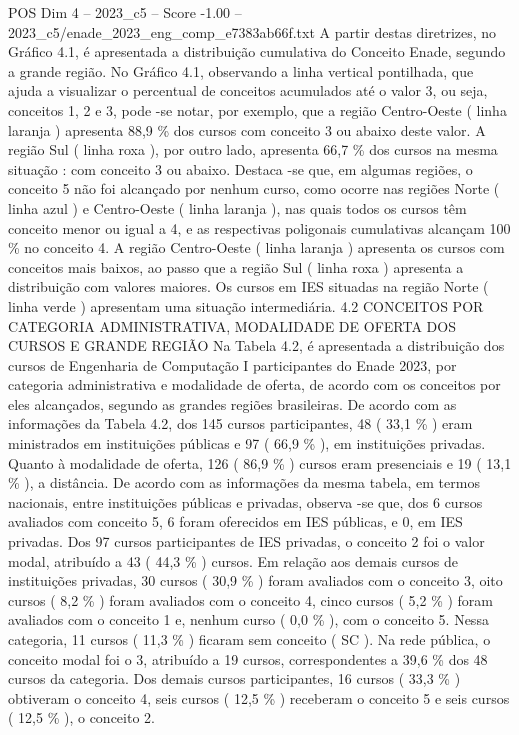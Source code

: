 \begin{textsample}{POS Dim 4 – 2023\_c5 – Score -1.00 – 2023\_c5/enade\_2023\_eng\_comp\_e7383ab66f.txt}
A partir destas diretrizes, no Gráfico 4.1, é apresentada a distribuição cumulativa do Conceito Enade, segundo a grande região.
No Gráfico 4.1, observando a linha vertical pontilhada, que ajuda a visualizar o percentual de conceitos acumulados até o valor 3, ou seja, conceitos 1, 2 e 3, pode -se notar, por exemplo, que a região Centro-Oeste ( linha laranja ) apresenta 88,9 \% dos cursos com conceito 3 ou abaixo deste valor.
A região Sul ( linha roxa ), por outro lado, apresenta 66,7 \% dos cursos na mesma situação : com conceito 3 ou abaixo.
Destaca -se que, em algumas regiões, o conceito 5 não foi alcançado por nenhum curso, como ocorre nas regiões Norte ( linha azul ) e Centro-Oeste ( linha laranja ), nas quais todos os cursos têm conceito menor ou igual a 4, e as respectivas poligonais cumulativas alcançam 100 \% no conceito 4.
A região Centro-Oeste ( linha laranja ) apresenta os cursos com conceitos mais baixos, ao passo que a região Sul ( linha roxa ) apresenta a distribuição com valores maiores.
Os cursos em IES situadas na região Norte ( linha verde ) apresentam uma situação intermediária. 4.2 CONCEITOS POR CATEGORIA ADMINISTRATIVA, MODALIDADE DE OFERTA DOS CURSOS E GRANDE REGIÃO Na Tabela 4.2, é apresentada a distribuição dos cursos de Engenharia de Computação I participantes do Enade 2023, por categoria administrativa e modalidade de oferta, de acordo com os conceitos por eles alcançados, segundo as grandes regiões brasileiras.
De acordo com as informações da Tabela 4.2, dos 145 cursos participantes, 48 ( 33,1 \% ) eram ministrados em instituições públicas e 97 ( 66,9 \% ), em instituições privadas.
Quanto à modalidade de oferta, 126 ( 86,9 \% ) cursos eram presenciais e 19 ( 13,1 \% ), a distância.
De acordo com as informações da mesma tabela, em termos nacionais, entre instituições públicas e privadas, observa -se que, dos 6 cursos avaliados com conceito 5, 6 foram oferecidos em IES públicas, e 0, em IES privadas.
Dos 97 cursos participantes de IES privadas, o conceito 2 foi o valor modal, atribuído a 43 ( 44,3 \% ) cursos.
Em relação aos demais cursos de instituições privadas, 30 cursos ( 30,9 \% ) foram avaliados com o conceito 3, oito cursos ( 8,2 \% ) foram avaliados com o conceito 4, cinco cursos ( 5,2 \% ) foram avaliados com o conceito 1 e, nenhum curso ( 0,0 \% ), com o conceito 5.
Nessa categoria, 11 cursos ( 11,3 \% ) ficaram sem conceito ( SC ).
Na rede pública, o conceito modal foi o 3, atribuído a 19 cursos, correspondentes a 39,6 \% dos 48 cursos da categoria.
Dos demais cursos participantes, 16 cursos ( 33,3 \% ) obtiveram o conceito 4, seis cursos ( 12,5 \% ) receberam o conceito 5 e seis cursos ( 12,5 \% ), o conceito 2.

\end{textsample}
